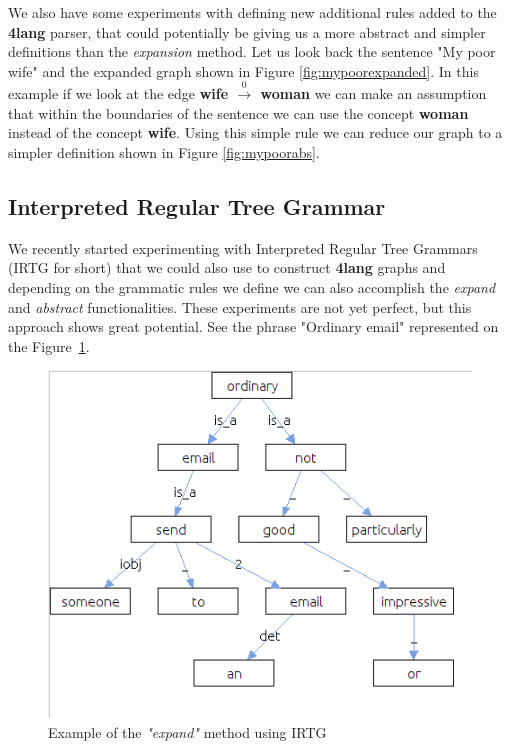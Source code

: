 We also have some experiments with defining new additional rules added to the \textbf{4lang} parser, that could potentially be giving us a more abstract and simpler definitions than the \textit{expansion} method. Let us look back the sentence "My poor wife" and the expanded graph shown in Figure \ref{fig:mypoorexpanded}. In this example if we look at the edge \textbf{wife $\xrightarrow0$ woman} we can make an assumption that within the boundaries of the sentence we can use the concept \textbf{woman} instead of the concept \textbf{wife}. Using this simple rule we can reduce our graph to a simpler definition shown in Figure \ref{fig:mypoorabs}.

\subsection{Interpreted Regular Tree Grammar}
We recently started experimenting with Interpreted Regular Tree Grammars \cite{Koller:2011} (IRTG for short) that we could also use to construct \textbf{4lang} graphs and depending on the grammatic rules we define we can also accomplish the \textit{expand} and \textit{abstract} functionalities. These experiments are not yet perfect, but this approach shows great potential. See the phrase "Ordinary email" represented on the Figure~\ref{fig:irtg}.

\begin{figure}[h]
	\centering
	\includegraphics[scale=0.75]{irtg.jpg}
	\caption{Example of the \textit{"expand"} method using IRTG}
	\label{fig:irtg}
\end{figure}